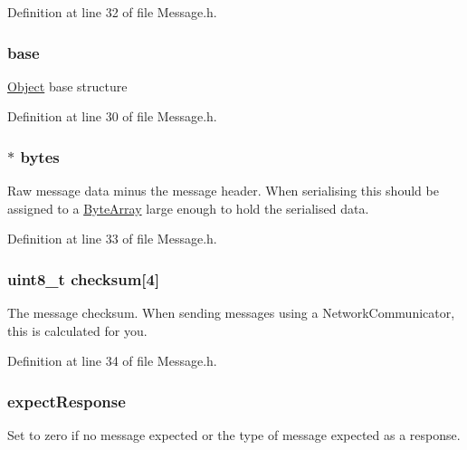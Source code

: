 Definition at line 32 of file Message.h.

\hypertarget{struct_message_a23cf4ef56ba22bed625eab08d6361fa7}{
\subsubsection[{base}]{ {\bf base}}}
\label{struct_message_a23cf4ef56ba22bed625eab08d6361fa7}
\hyperlink{struct_object}{Object} base structure 

Definition at line 30 of file Message.h.

\hypertarget{struct_message_affc357b616afe9b58c190ae4b21caa77}{
\subsubsection[{bytes}]{$\ast$ {\bf bytes}}}
\label{struct_message_affc357b616afe9b58c190ae4b21caa77}
Raw message data minus the message header. When serialising this should be assigned to a \hyperlink{struct_byte_array}{ByteArray} large enough to hold the serialised data. 

Definition at line 33 of file Message.h.

\hypertarget{struct_message_a02d93e565ee31bda6e0211dca9b42be5}{
\subsubsection[{checksum}]{\setlength{\rightskip}{0pt plus 5cm}uint8\_\-t {\bf checksum}\mbox{[}4\mbox{]}}}
\label{struct_message_a02d93e565ee31bda6e0211dca9b42be5}
The message checksum. When sending messages using a NetworkCommunicator, this is calculated for you. 

Definition at line 34 of file Message.h.

\hypertarget{struct_message_accc3616411ea4a5035a7eaf42132d370}{
\subsubsection[{expectResponse}]{ {\bf expectResponse}}}
\label{struct_message_accc3616411ea4a5035a7eaf42132d370}
Set to zero if no message expected or the type of message expected as a response. 

